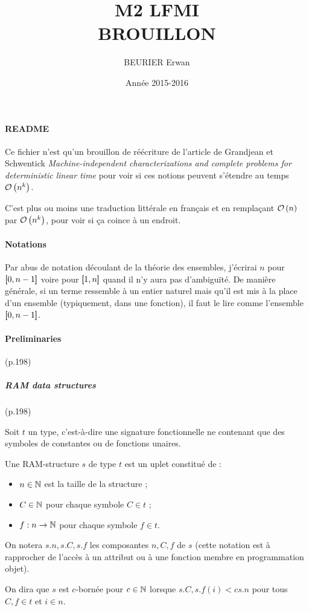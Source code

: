 \documentclass{article}
\author{BEURIER Erwan}
\title{M2 LFMI \\ BROUILLON }
\date{Année 2015-2016}
\begin{document}
	
	
	\paragraph{README}
	
	
	Ce fichier n'est qu'un brouillon de réécriture de l'article de Grandjean et Schwentick \emph{Machine-independent characterizations and complete problems for deterministic linear time} pour voir si ces notions peuvent s'étendre au temps $\mathcal{O}\left( n^k \right)$.
	
	C'est plus ou moins une traduction littérale en français et en remplaçant $\mathcal{O}\left( n \right)$ par $\mathcal{O}\left( n^k \right)$, pour voir si ça coince à un endroit.
	
	
	\paragraph{Notations}
	
	
	Par abus de notation découlant de la théorie des ensembles, j'écrirai $n$ pour $\left[\!\!\>\!\left[ 0 , n-1 \right]\!\!\>\!\right]$ voire pour $\left[\!\!\>\!\left[ 1 , n \right]\!\!\>\!\right]$ quand il n'y aura pas d'ambiguïté. De manière générale, si un terme ressemble à un entier naturel mais qu'il est mis à la place d'un ensemble (typiquement, dans une fonction), il faut le lire comme l'ensemble $\left[\!\!\>\!\left[ 0 , n-1 \right]\!\!\>\!\right]$.
	
	\pagebreak
	
	\paragraph{Preliminaries} (p.198)
	
	
		\subparagraph{RAM data structures} (p.198)
	

		\begin{definition}
			Soit $t$ un type, c'est-à-dire une signature fonctionnelle ne contenant que des symboles de constantes ou de fonctions unaires.
			
			Une RAM-structure $s$ de type $t$ est un uplet constitué de :
			\begin{itemize}[itemsep=-1mm]
				\item 	$n \in \mathbb{N}$ est la taille de la structure ;
				\item 	$C \in \mathbb{N}$ pour chaque symbole $C \in t$ ;
				\item 	$f : n \to \mathbb{N}$ pour chaque symbole $f \in t$.
			\end{itemize}
			
			On notera $s.n, s.C, s.f$ les composantes $n, C, f$ de $s$ (cette notation est à rapprocher de l'accès à un attribut ou à une fonction membre en programmation objet).
			
			On dira que $s$ est $c$-bornée pour $c\in\mathbb{N}$ lorsque $s.C, s.f(i) < c s.n$ pour tous $C, f \in t$ et $i \in n$.
		\end{definition}
	
\end{document}
